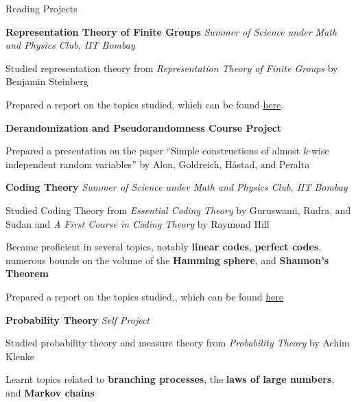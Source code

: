 \begin{rubric}{Reading Projects}

	\entry*[2022] \textbf{Representation Theory of Finite Groups} \hfill \emph{Summer of Science under Math and Physics Club, IIT Bombay}

		Studied representation theory from \emph{Representation Theory of Finite Groups} by Benjamin Steinberg

		Prepared a report on the topics studied, which can be found \href{https://amitrajaraman.github.io/notes/rep-th/main.pdf}{here}.

	\entry*[2022\phantom{}] \textbf{Derandomization and Pseudorandomness Course Project}

		Prepared a presentation on the paper ``Simple constructions of almost $k$-wise independent random variables'' by Alon, Goldreich, H\r{a}stad, and Peralta



	\entry*[2020] \textbf{Coding Theory} \hfill \emph{Summer of Science under Math and Physics Club, IIT Bombay}

		Studied Coding Theory from \textit{Essential Coding Theory} by Guruswami, Rudra, and Sudan and \textit{A First Course in Coding Theory} by Raymond Hill
		
		Became proficient in several topics, notably \textbf{linear codes}, \textbf{perfect codes}, numerous bounds on the volume of the \textbf{Hamming sphere}, and \textbf{Shannon's Theorem}

		Prepared a report on the topics studied,, which can be found \href{https://amitrajaraman.github.io/notes/coding-th/Coding_Theory.pdf}{here}

	\entry*[2020\phantom{}] \textbf{Probability Theory} \hfill \textit{Self Project}

		Studied probability theory and measure theory from \textit{Probability Theory} by Achim Klenke

		Learnt topics related to \textbf{branching processes}, the \textbf{laws of large numbers}, and \textbf{Markov chains}


        
\end{rubric}